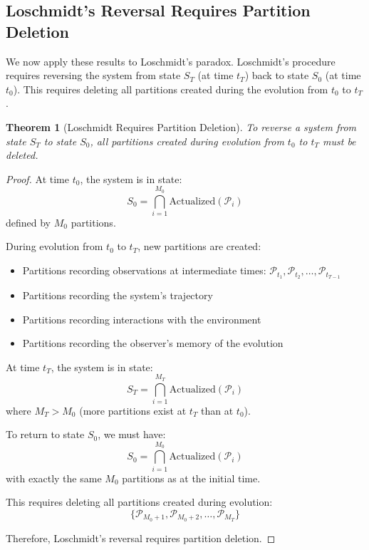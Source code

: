 \documentclass[twocolumn,10pt]{article}
\newtheorem{theorem}{Theorem}[section]
\theoremstyle{definition}
\theoremstyle{remark}
\begin{document}
\subsection{Loschmidt's Reversal Requires Partition Deletion}

We now apply these results to Loschmidt's paradox. Loschmidt's procedure requires reversing the system from state $S_T$ (at time $t_T$) back to state $S_0$ (at time $t_0$). This requires deleting all partitions created during the evolution from $t_0$ to $t_T$.

\begin{theorem}[Loschmidt Requires Partition Deletion]
\label{thm:loschmidt_requires_deletion}
To reverse a system from state $S_T$ to state $S_0$, all partitions created during evolution from $t_0$ to $t_T$ must be deleted.
\end{theorem}

\begin{proof}
At time $t_0$, the system is in state:
\begin{equation}
S_0 = \bigcap_{i=1}^{M_0} \text{Actualized}(\mathcal{P}_i)
\end{equation}
defined by $M_0$ partitions.

During evolution from $t_0$ to $t_T$, new partitions are created:
\begin{itemize}
\item Partitions recording observations at intermediate times: $\mathcal{P}_{t_1}, \mathcal{P}_{t_2}, \ldots, \mathcal{P}_{t_{T-1}}$
\item Partitions recording the system's trajectory
\item Partitions recording interactions with the environment
\item Partitions recording the observer's memory of the evolution
\end{itemize}

At time $t_T$, the system is in state:
\begin{equation}
S_T = \bigcap_{i=1}^{M_T} \text{Actualized}(\mathcal{P}_i)
\end{equation}
where $M_T > M_0$ (more partitions exist at $t_T$ than at $t_0$).

To return to state $S_0$, we must have:
\begin{equation}
S_0 = \bigcap_{i=1}^{M_0} \text{Actualized}(\mathcal{P}_i)
\end{equation}
with exactly the same $M_0$ partitions as at the initial time.

This requires deleting all partitions created during evolution:
\begin{equation}
\{\mathcal{P}_{M_0+1}, \mathcal{P}_{M_0+2}, \ldots, \mathcal{P}_{M_T}\}
\end{equation}

Therefore, Loschmidt's reversal requires partition deletion.
\end{proof}
\end{document}
